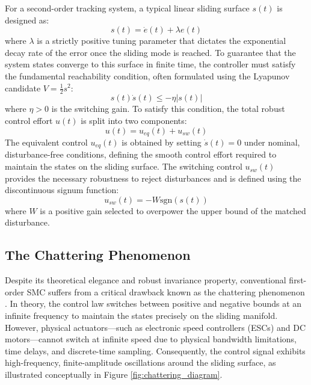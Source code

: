 For a second-order tracking system, a typical linear sliding surface $s(t)$ is designed as:
\begin{equation}
s(t) = \dot{e}(t) + \lambda e(t)
\end{equation}
where $\lambda$ is a strictly positive tuning parameter that dictates the exponential decay rate of the error once the sliding mode is reached. To guarantee that the system states converge to this surface in finite time, the controller must satisfy the fundamental reachability condition, often formulated using the Lyapunov candidate $V = \frac{1}{2} s^2$:
\begin{equation}
s(t)\dot{s}(t) \leq -\eta |s(t)|
\end{equation}
where $\eta > 0$ is the switching gain. To satisfy this condition, the total robust control effort $u(t)$ is split into two components:
\begin{equation}
u(t) = u_{eq}(t) + u_{sw}(t)
\end{equation}
The equivalent control $u_{eq}(t)$ is obtained by setting $\dot{s}(t) = 0$ under nominal, disturbance-free conditions, defining the smooth control effort required to maintain the states on the sliding surface. The switching control $u_{sw}(t)$ provides the necessary robustness to reject disturbances and is defined using the discontinuous signum function:
\begin{equation}
u_{sw}(t) = -W \text{sgn}(s(t))
\end{equation}
where $W$ is a positive gain selected to overpower the upper bound of the matched disturbance.

\subsection{The Chattering Phenomenon}
Despite its theoretical elegance and robust invariance property, conventional first-order SMC suffers from a critical drawback known as the chattering phenomenon \cite{ref_18, ref_32}. In theory, the control law switches between positive and negative bounds at an infinite frequency to maintain the states precisely on the sliding manifold. However, physical actuators—such as electronic speed controllers (ESCs) and DC motors—cannot switch at infinite speed due to physical bandwidth limitations, time delays, and discrete-time sampling. Consequently, the control signal exhibits high-frequency, finite-amplitude oscillations around the sliding surface, as illustrated conceptually in Figure \ref{fig:chattering_diagram}.

